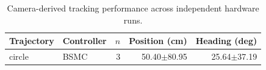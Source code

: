 \begin{table}[!t]
\centering
\caption{Camera-derived tracking performance across independent hardware runs.}
\label{tab:tracking}
\begin{tabular}{llrrr}
\hline
Trajectory & Controller & $n$ & Position (cm) & Heading (deg) \\
\hline
circle & BSMC & 3 & 50.40$\pm$80.95 & 25.64$\pm$37.19 \\
\hline
\end{tabular}
\end{table}
